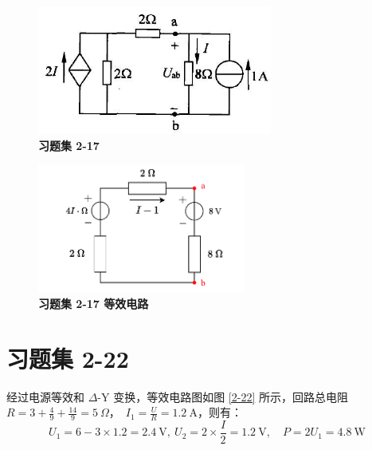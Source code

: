 \documentclass[UTF8]{report}
\theoremstyle{MyLineTheoremStyle} %
\theoremstyle{MyBlockTheoremStyle} %
\theoremstyle{MySubsubsectionStyle} %
\begin{document}
\noindent\begin{minipage}{0.49\textwidth}
\begin{figure}[H]\centering
\includegraphics[height=120pt]{assets/2/78473b1c403974e048249bbdbf6a152f.jpg}
\caption{\textbf{习题集 2-17}}
\end{figure}
\end{minipage}\hfill
\begin{minipage}{0.49\textwidth}
\begin{figure}[H]\centering
\includegraphics[height=120pt]{assets/2/2-17.drawio.pdf}
\caption{\textbf{习题集 2-17 等效电路}}\label{2-17}
\end{figure}
\end{minipage}



\section{习题集 2-22}

经过电源等效和 $\Delta$-Y 变换，等效电路图如图 \ref{2-22} 所示，回路总电阻 $R = 3 + \frac{4}{9} + \frac{14}{9} = 5\ \Omega$，\ $I_1 = \frac{U}{R} = 1.2\ \mathrm{A}$，则有：
\begin{equation*}
U_1 = 6 - 3\times 1.2 = 2.4\ \mathrm{V},\ U_2 = 2\times \frac{I}{2} = 1.2\ \mathrm{V},\quad P = 2 U_1 = 4.8\ \mathrm{W}
\end{equation*}
\end{document}
